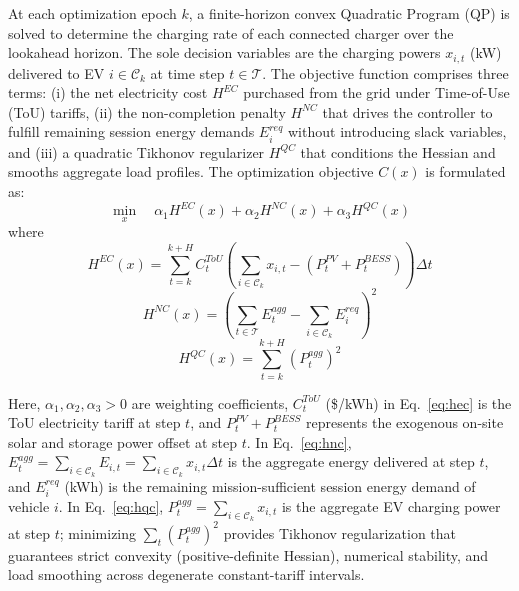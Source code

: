 \documentclass[final,3p,times,twocolumn]{elsarticle}
\begin{document}
At each optimization epoch $k$, a finite-horizon convex Quadratic Program (QP) is solved to determine the charging rate of each connected charger over the lookahead horizon. The sole decision variables are the charging powers $x_{i,t}$ (kW) delivered to EV $i \in \mathcal{C}_k$ at time step $t \in \mathcal{T}$. The objective function comprises three terms: (i) the net electricity cost $H^{EC}$ purchased from the grid under Time-of-Use (ToU) tariffs, (ii) the non-completion penalty $H^{NC}$ that drives the controller to fulfill remaining session energy demands $E_i^{req}$ without introducing slack variables, and (iii) a quadratic Tikhonov regularizer $H^{QC}$ that conditions the Hessian and smooths aggregate load profiles. The optimization objective $C(x)$ is formulated as:
\begin{equation}
    \min_{x} \quad \alpha_1 H^{EC}(x) + \alpha_2 H^{NC}(x) + \alpha_3 H^{QC}(x)
    \label{eq:obj}
\end{equation}
where
\begin{equation}
    H^{EC}(x) = \sum_{t=k}^{k+H} C_t^{ToU} \left( \sum_{i \in \mathcal{C}_k} x_{i,t} - (P_t^{PV} + P_t^{BESS}) \right) \Delta t
    \label{eq:hec}
\end{equation}
\begin{equation}
    H^{NC}(x) = \left( \sum_{t \in \mathcal{T}} E_t^{agg} - \sum_{i \in \mathcal{C}_k} E_i^{req} \right)^2
    \label{eq:hnc}
\end{equation}
\begin{equation}
    H^{QC}(x) = \sum_{t=k}^{k+H} (P_t^{agg})^2
    \label{eq:hqc}
\end{equation}

Here, $\alpha_1, \alpha_2, \alpha_3 > 0$ are weighting coefficients, $C_t^{ToU}$ (\$/kWh) in Eq.~\eqref{eq:hec} is the ToU electricity tariff at step $t$, and $P_t^{PV} + P_t^{BESS}$ represents the exogenous on-site solar and storage power offset at step $t$. In Eq.~\eqref{eq:hnc}, $E_t^{agg} = \sum_{i \in \mathcal{C}_k} E_{i,t} = \sum_{i \in \mathcal{C}_k} x_{i,t}\Delta t$ is the aggregate energy delivered at step $t$, and $E_i^{req}$ (kWh) is the remaining mission-sufficient session energy demand of vehicle $i$. In Eq.~\eqref{eq:hqc}, $P_t^{agg} = \sum_{i \in \mathcal{C}_k} x_{i,t}$ is the aggregate EV charging power at step $t$; minimizing $\sum_t (P_t^{agg})^2$ provides Tikhonov regularization that guarantees strict convexity (positive-definite Hessian), numerical stability, and load smoothing across degenerate constant-tariff intervals.
\end{document}
